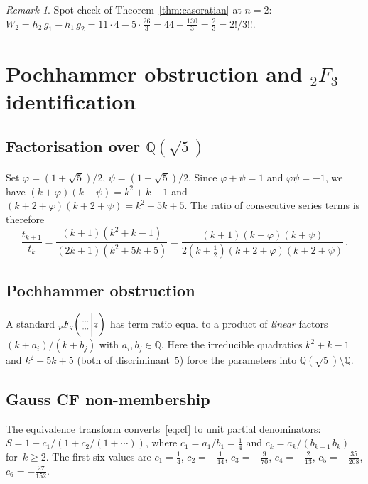 \documentclass[11pt]{article}
\newcommand{\half}{\tfrac{1}{2}}
\newcommand{\hyp}[5]{{{}_{#1}F_{#2}}\!\left(\genfrac{}{}{0pt}{}{#3}{#4}\bigg|#5\right)}
\theoremstyle{remark}
\newtheorem{remark}[theorem]{Remark}
\begin{document}
\begin{remark}
Spot-check of Theorem~\ref{thm:casoratian} at $n=2$:
$W_2 = h_2\,g_1 - h_1\,g_2 = 11\cdot 4 - 5\cdot\frac{26}{3}
= 44 - \frac{130}{3} = \frac{2}{3} = 2!/3!!$.\;\checkmark
\end{remark}


\section{Pochhammer obstruction and ${}_2F_3$ identification}%
\label{sec:pochhammer}

\subsection{Factorisation over $\mathbb{Q}(\sqrt{5})$}

Set $\varphi=(1{+}\sqrt5)/2$, $\psi=(1{-}\sqrt5)/2$.
Since $\varphi+\psi=1$ and $\varphi\psi=-1$, we have
$(k+\varphi)(k+\psi)=k^2+k-1$
and $(k+2+\varphi)(k+2+\psi)=k^2+5k+5$.
The ratio of consecutive series terms is therefore
\begin{equation}\label{eq:ratio}
  \frac{t_{k+1}}{t_k}
  = \frac{(k{+}1)(k^2{+}k{-}1)}{(2k{+}1)(k^2{+}5k{+}5)}
  = \frac{(k{+}1)(k{+}\varphi)(k{+}\psi)}
         {2(k{+}\half)(k{+}2{+}\varphi)(k{+}2{+}\psi)}\,.
\end{equation}

\subsection{Pochhammer obstruction}

A standard $\hyp{p}{q}{\cdots}{\cdots}{z}$ has term ratio equal to
a product of \emph{linear} factors $(k+a_i)/(k+b_j)$ with
$a_i,b_j\in\mathbb{Q}$.  Here the irreducible quadratics
$k^2+k-1$ and $k^2+5k+5$ (both of discriminant~$5$) force the
parameters into $\mathbb{Q}(\sqrt5)\setminus\mathbb{Q}$.

\subsection{Gauss CF non-membership}

The equivalence transform converts~\eqref{eq:cf} to unit partial
denominators: $S = 1 + c_1/(1 + c_2/(1 + \cdots))$, where
$c_1 = a_1/b_1 = \tfrac{1}{4}$ and
$c_k = a_k/(b_{k-1}\,b_k)$ for~$k\geq 2$.  The first six
values are $c_1 = \tfrac{1}{4}$,
$c_2 = -\tfrac{1}{14}$, $c_3 = -\tfrac{9}{70}$,
$c_4 = -\tfrac{2}{13}$, $c_5 = -\tfrac{35}{208}$,
$c_6 = -\tfrac{27}{152}$.
\end{document}
